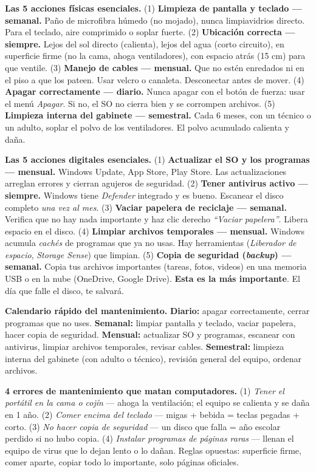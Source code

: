 \documentclass[11pt,letterpaper]{article}
\newcommand{\milcpaso}[3]{%
\Needspace{4\baselineskip}%
\begin{tcolorbox}[enhanced,colback=white,colframe=milcLinea,arc=1.5mm,boxrule=.9pt,
  left=14mm,right=4mm,top=3mm,bottom=3mm,before skip=4pt,after skip=4pt,
  fontupper=\RaggedRight,
  overlay={\node[anchor=north west,circle,fill=#2,text=white,inner sep=0pt,
    minimum size=7.4mm,font=\sffamily\bfseries\small]
    at ([xshift=3.6mm,yshift=-3.2mm]frame.north west) {#1};}]
#3
\end{tcolorbox}}
\begin{document}
\milcpaso{1}{milcTurquesa}{\textbf{Las 5 acciones físicas esenciales.} (1) \textbf{Limpieza de pantalla y teclado --- semanal.} Paño de microfibra húmedo (no mojado), nunca limpiavidrios directo. Para el teclado, aire comprimido o soplar fuerte. (2) \textbf{Ubicación correcta --- siempre.} Lejos del sol directo (calienta), lejos del agua (corto circuito), en superficie firme (no la cama, ahoga ventiladores), con espacio atrás (15 cm) para que ventile. (3) \textbf{Manejo de cables --- mensual.} Que no estén enredados ni en el piso a que los pateen. Usar velcro o canaleta. Desconectar antes de mover. (4) \textbf{Apagar correctamente --- diario.} Nunca apagar con el botón de fuerza: usar el menú \emph{Apagar}. Si no, el SO no cierra bien y se corrompen archivos. (5) \textbf{Limpieza interna del gabinete --- semestral.} Cada 6 meses, con un técnico o un adulto, soplar el polvo de los ventiladores. El polvo acumulado calienta y daña.}
\milcpaso{2}{milcTurquesa}{\textbf{Las 5 acciones digitales esenciales.} (1) \textbf{Actualizar el SO y los programas --- mensual.} Windows Update, App Store, Play Store. Las actualizaciones arreglan errores y cierran agujeros de seguridad. (2) \textbf{Tener antivirus activo --- siempre.} Windows tiene \emph{Defender} integrado y es bueno. Escanear el disco completo \emph{una vez al mes}. (3) \textbf{Vaciar papelera de reciclaje --- semanal.} Verifica que no hay nada importante y haz clic derecho \emph{``Vaciar papelera''}. Libera espacio en el disco. (4) \textbf{Limpiar archivos temporales --- mensual.} Windows acumula \emph{cachés} de programas que ya no usas. Hay herramientas (\emph{Liberador de espacio}, \emph{Storage Sense}) que limpian. (5) \textbf{Copia de seguridad (\emph{backup}) --- semanal.} Copia tus archivos importantes (tareas, fotos, videos) en una memoria USB o en la nube (OneDrive, Google Drive). \textbf{Esta es la más importante}. El día que falle el disco, te salvará.}
\milcpaso{3}{milcTurquesa}{\textbf{Calendario rápido del mantenimiento.} \textbf{Diario:} apagar correctamente, cerrar programas que no uses. \textbf{Semanal:} limpiar pantalla y teclado, vaciar papelera, hacer copia de seguridad. \textbf{Mensual:} actualizar SO y programas, escanear con antivirus, limpiar archivos temporales, revisar cables. \textbf{Semestral:} limpieza interna del gabinete (con adulto o técnico), revisión general del equipo, ordenar archivos.}
\milcpaso{4}{milcTurquesa}{\textbf{4 errores de mantenimiento que matan computadores.} (1) \emph{Tener el portátil en la cama o cojín} --- ahoga la ventilación; el equipo se calienta y se daña en 1 año. (2) \emph{Comer encima del teclado} --- migas + bebida = teclas pegadas + corto. (3) \emph{No hacer copia de seguridad} --- un disco que falla = año escolar perdido si no hubo copia. (4) \emph{Instalar programas de páginas raras} --- llenan el equipo de virus que lo dejan lento o lo dañan. Reglas opuestas: superficie firme, comer aparte, copiar todo lo importante, solo páginas oficiales.}
\end{document}

